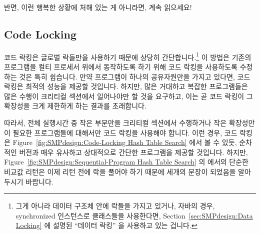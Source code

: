 반면, 이런 행복한 상황에 처해 있는 게 아니라면, 계속 읽으세요!

\subsection{Code Locking}
\label{sec:SMPdesign:Code Locking}

코드 락킹은 글로벌 락들만을 사용하기 때문에 상당히 간단합니다.\footnote{
	그게 아니라 데이터 구조체 안에 락들을 가지고 있거나, 자바의 경우,
	synchronized 인스턴스로 클래스들을 사용한다면,
	Section~\ref{sec:SMPdesign:Data Locking} 에 설명된 ``데이터 락킹'' 을
	사용하고 있는 겁니다.}
이 방법은 기존의 프로그램을 컬티 프로세서 위에서 동작하도록 하기 위해 코드
락킹을 사용하도록 수정하는 것은 특히 쉽습니다.
만약 프로그램이 하나의 공유자원만을 가지고 있다면, 코드 락킹은 최적의 성능을
제공할 것입니다.
하지만, 많은 거대하고 복잡한 프로그램들은 많은 수행이 크리티컬 섹션에서
일어나야만 할 것을 요구하고, 이는 곧 코드 락킹이 그 확장성을 크게 제한하게 하는
결과를 초래합니다.

따라서, 전체 실행시간 중 작은 부분만을 크리티컬 섹션에서 수행하거나 작은
확장성만이 필요한 프로그램들에 대해서만 코드 락킹을 사용해야 합니다.
이런 경우, 코드 락킹은
Figure~\ref{fig:SMPdesign:Code-Locking Hash Table Search} 에서 볼 수 있듯,
순차적인 버전과 매우 유사하고 상대적으로 간단한 프로그램을 제공할 것입니다.
하지만, Figure~\ref{fig:SMPdesign:Sequential-Program Hash Table Search} 의
 에서의 단순한 비교값 리턴은 이제 리턴 전에 락을 풀어야 하기
때문에 세개의 문장이 되었음을 알아 두시기 바랍니다.

